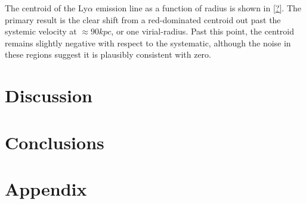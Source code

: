 \documentclass[linenumbers,amsmath,trackchanges,preprint2]{aastex702}
\begin{document}
\par The centroid of the Ly$\alpha$ emission line as a function of radius is shown in \ref{?}. The primary result is the clear shift from a red-dominated centroid out past the systemic velocity at $\approx90kpc$, or one virial-radius. Past this point, the centroid remains slightly negative with respect to the systematic, although the noise in these regions suggest it is plausibly consistent with zero.

\section{Discussion}

\section{Conclusions}


\begin{acknowledgments}
\end{acknowledgments}

\begin{contribution}
\end{contribution}

\facilities{} %
\software{}   %




\section{Appendix}
\end{document}
